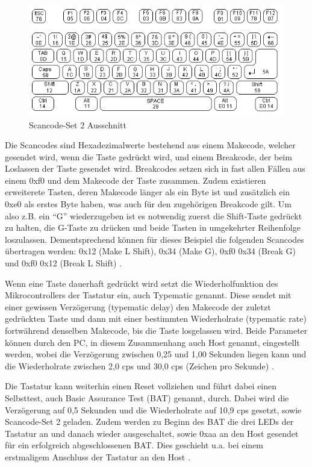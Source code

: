 \begin{figure}
  \centering
  \includegraphics[width=1\textwidth]{images/scancodes.jpg}
  \caption{Scancode-Set 2 Ausschnitt}
  \label{scancodes}
\end{figure}

Die Scancodes sind Hexadezimalwerte bestehend aus einem Makecode, welcher gesendet wird, wenn die Taste gedrückt wird, und einem Breakcode, der beim Loslassen der Taste gesendet wird. Breakcodes setzen sich in fast allen Fällen aus einem 0xf0 und dem Makecode der Taste zusammen. Zudem existieren erweiterete Tasten, deren Makecode länger als ein Byte ist und zusätzlich ein 0xe0 als erstes Byte haben, was auch für den zugehörigen Breakcode gilt. Um also z.B. ein ``G'' wiederzugeben ist es notwendig zuerst die Shift-Taste gedrückt zu halten, die G-Taste zu drücken und beide Tasten in umgekehrter Reihenfolge loszulassen. Dementsprechend können für dieses Beispiel die folgenden Scancodes übertragen werden: 0x12 (Make L Shift), 0x34 (Make G), 0xf0 0x34 (Break G) und 0xf0 0x12 (Break L Shift) \cite{chapweske} \cite{mock}.

Wenn eine Taste dauerhaft gedrückt wird setzt die Wiederholfunktion des Mikrocontrollers der Tastatur ein, auch Typematic genannt. Diese sendet mit einer gewissen Verzögerung (typematic delay) den Makecode der zuletzt gedrückten Taste und dann mit einer bestimmten Wiederholrate (typematic rate) fortwährend denselben Makecode, bis die Taste losgelassen wird. Beide Parameter können durch den PC, in diesem Zusammenhang auch Host genannt, eingestellt werden, wobei die Verzögerung zwischen 0,25 und 1,00 Sekunden liegen kann und die Wiederholrate zwischen 2,0 cps und 30,0 cps (Zeichen pro Sekunde) \cite{chapweske} \cite{mock}.

Die Tastatur kann weiterhin einen Reset vollziehen und führt dabei einen Selbsttest, auch Basic Assurance Test (BAT) genannt, durch. Dabei wird die Verzögerung auf 0,5 Sekunden und die Wiederholrate auf 10,9 cps gesetzt, sowie Scancode-Set 2 geladen. Zudem werden zu Beginn des BAT die drei LEDs der Tastatur an und danach wieder ausgeschaltet, sowie 0xaa an den Host gesendet für ein erfolgreich abgeschlossenen BAT. Dies geschieht u.a. bei einem erstmaligem Anschluss der Tastatur an den Host \cite{chapweske} \cite{mock}.

